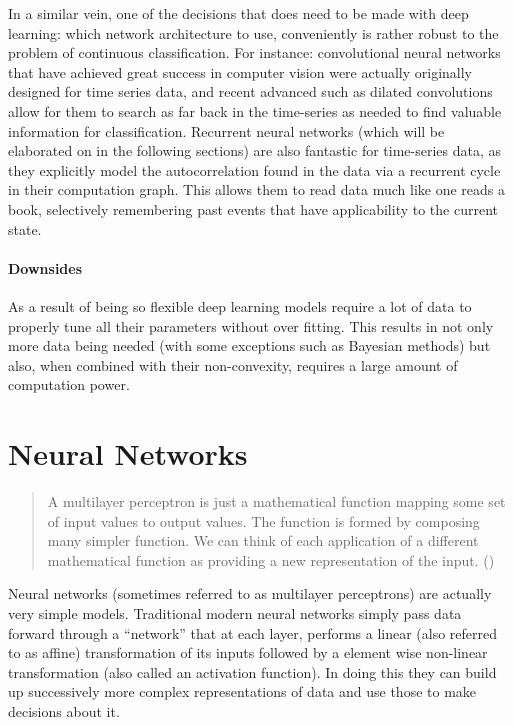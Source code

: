 \documentclass[]{book}
\theoremstyle{definition}
\theoremstyle{definition}
\theoremstyle{definition}
\theoremstyle{remark}
\begin{document}
In a similar vein, one of the decisions that does need to be made with
deep learning: which network architecture to use, conveniently is rather
robust to the problem of continuous classification. For instance:
convolutional neural networks that have achieved great success in
computer vision were actually originally designed for time series data,
and recent advanced such as dilated convolutions allow for them to
search as far back in the time-series as needed to find valuable
information for classification. Recurrent neural networks (which will be
elaborated on in the following sections) are also fantastic for
time-series data, as they explicitly model the autocorrelation found in
the data via a recurrent cycle in their computation graph. This allows
them to read data much like one reads a book, selectively remembering
past events that have applicability to the current state.

\subsubsection{Downsides}\label{downsides}

As a result of being so flexible deep learning models require a lot of
data to properly tune all their parameters without over fitting. This
results in not only more data being needed (with some exceptions such as
Bayesian methods) but also, when combined with their non-convexity,
requires a large amount of computation power.

\chapter{Neural Networks}\label{neuralnetworks}

\begin{quote}
A multilayer perceptron is just a mathematical function mapping some set
of input values to output values. The function is formed by composing
many simpler function. We can think of each application of a different
mathematical function as providing a new representation of the input.
(\citet{goodfellow_DL})
\end{quote}

Neural networks (sometimes referred to as multilayer perceptrons) are
actually very simple models. Traditional modern neural networks simply
pass data forward through a ``network'' that at each layer, performs a
linear (also referred to as affine) transformation of its inputs
followed by a element wise non-linear transformation (also called an
activation function). In doing this they can build up successively more
complex representations of data and use those to make decisions about
it.
\end{document}
